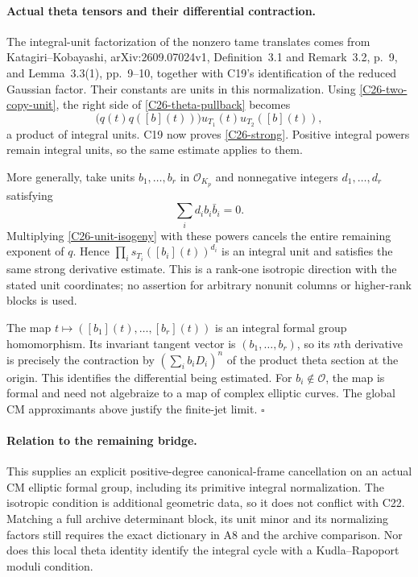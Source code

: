 \documentclass[11pt]{article}
\theoremstyle{definition}\newtheorem{definition}[theorem]{Definition}\newtheorem{remark}[theorem]{Remark}
\begin{document}
\paragraph{Actual theta tensors and their differential contraction.}
The integral-unit factorization of the nonzero tame translates comes
from Katagiri--Kobayashi, arXiv:2609.07024v1,
Definition~3.1 and Remark~3.2, p.~9, and Lemma~3.3(1),
pp.~9--10, together with C19's identification of the reduced
Gaussian factor.  Their constants are units in this normalization.
Using \eqref{C26-two-copy-unit}, the right side of
\eqref{C26-theta-pullback} becomes
\[
       \bigl(q(t)q([b](t))\bigr)
          u_{T_1}(t)u_{T_2}([b](t)),
\]
a product of integral units.  C19 now proves
\eqref{C26-strong}.  Positive integral powers remain integral
units, so the same estimate applies to them.

More generally, take units $b_1,\ldots,b_r$ in
$\mathcal O_{K_p}$ and nonnegative integers $d_1,\ldots,d_r$
satisfying
\[
                  \sum_i d_i b_i\bar b_i=0.
\]
Multiplying \eqref{C26-unit-isogeny} with these powers cancels
the entire remaining exponent of $q$.  Hence
$\prod_i s_{T_i}([b_i](t))^{d_i}$ is an integral unit and
satisfies the same strong derivative estimate.
This is a rank-one isotropic direction with the stated
unit coordinates; no assertion for arbitrary nonunit columns
or higher-rank blocks is used.

The map $t\mapsto([b_1](t),\ldots,[b_r](t))$ is an integral
formal group homomorphism.  Its invariant tangent vector is
$(b_1,\ldots,b_r)$, so its $n$th derivative is precisely the
contraction by
$(\sum_i b_iD_i)^n$ of the product theta section at the origin.
This identifies the differential being estimated.  For
$b_i\notin\mathcal O$, the map is formal and need not
algebraize to a map of complex elliptic curves.
The global CM approximants above justify the finite-jet limit.
\hfill$\square$

\paragraph{Relation to the remaining bridge.}
This supplies an explicit positive-degree canonical-frame
cancellation on an actual CM elliptic formal group, including
its primitive integral normalization.  The isotropic condition
is additional geometric data, so it does not conflict with
C22.  Matching a full archive determinant block, its unit minor
and its normalizing factors still requires the exact dictionary
in A8 and the archive comparison.  Nor does this local
theta identity identify the integral cycle with a
Kudla--Rapoport moduli condition.
\end{document}
